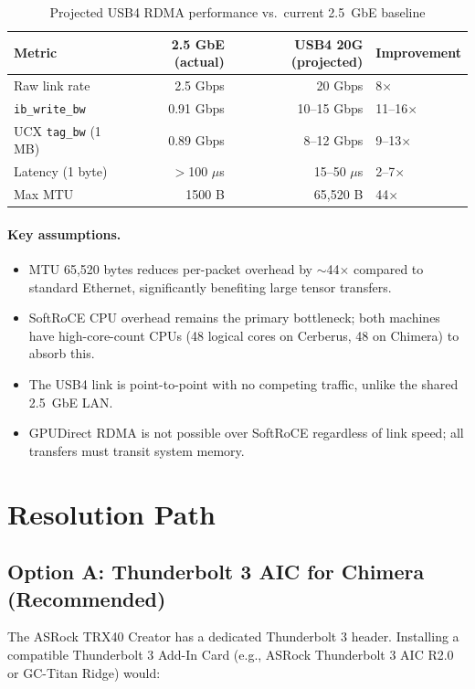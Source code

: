 \documentclass[11pt,letterpaper]{article}
\begin{document}
\begin{table}[htbp]
\centering
\caption{Projected USB4 RDMA performance vs.\ current 2.5~GbE baseline}
\label{tab:usb4-projected}
\begin{tabular}{@{}lrrl@{}}
\toprule
\textbf{Metric} & \textbf{2.5 GbE (actual)} & \textbf{USB4 20G (projected)} & \textbf{Improvement} \\
\midrule
Raw link rate & 2.5 Gbps & 20 Gbps & 8$\times$ \\
\texttt{ib\_write\_bw} & 0.91 Gbps & 10--15 Gbps & 11--16$\times$ \\
UCX \texttt{tag\_bw} (1 MB) & 0.89 Gbps & 8--12 Gbps & 9--13$\times$ \\
Latency (1 byte) & $>$100 $\mu$s & 15--50 $\mu$s & 2--7$\times$ \\
Max MTU & 1500 B & 65,520 B & 44$\times$ \\
\bottomrule
\end{tabular}
\end{table}

\paragraph{Key assumptions.}
\begin{itemize}
    \item MTU 65,520 bytes reduces per-packet overhead by $\sim$44$\times$ compared to standard Ethernet, significantly benefiting large tensor transfers.
    \item SoftRoCE CPU overhead remains the primary bottleneck; both machines have high-core-count CPUs (48 logical cores on Cerberus, 48 on Chimera) to absorb this.
    \item The USB4 link is point-to-point with no competing traffic, unlike the shared 2.5~GbE LAN.
    \item GPUDirect RDMA is not possible over SoftRoCE regardless of link speed; all transfers must transit system memory.
\end{itemize}

\section{Resolution Path}

\subsection{Option A: Thunderbolt 3 AIC for Chimera (Recommended)}

The ASRock TRX40 Creator has a dedicated Thunderbolt 3 header. Installing a compatible Thunderbolt 3 Add-In Card (e.g., ASRock Thunderbolt 3 AIC R2.0 or GC-Titan Ridge) would:
\end{document}
